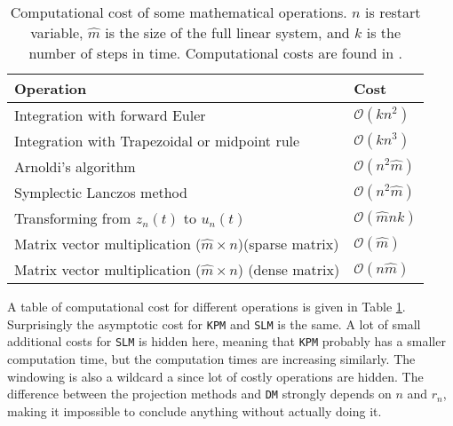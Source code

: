 \begin{table}
\caption{Computational cost of some mathematical operations. $n$ is restart variable, $\hat{m}$ is the size of the full linear system, and $k$ is the number of steps in time. Computational costs are found in \cite{complex}. }
\centering
\begin{tabular}{l l }
Operation & Cost \\
\hline
Integration with forward Euler & $\mathcal{O}(k n^2)$ \\
Integration with Trapezoidal or midpoint rule & $\mathcal{O}(k n^3)$ \\
Arnoldi's algorithm & $ \mathcal{ O }(n^2 \hat{m})$ \\
Symplectic Lanczos method & $ \mathcal{O}(n^2 \hat{m}) $\\
Transforming from $z_n(t)$ to $u_n(t)$ & $ \mathcal{O}(\hat{m}nk) $\\
Matrix vector multiplication ($\hat{m}\times n$)(sparse matrix) & $ \mathcal{O}(\hat{m}) $ \\
Matrix vector multiplication ($\hat{m}\times n$) (dense matrix) & $ \mathcal{O}(n \hat{m}) $
\end{tabular}


\label{tab:cd}
\end{table}

\noindent A table of computational cost for different operations is given in Table \ref{tab:cd}. \\
Surprisingly the asymptotic cost for \texttt{KPM} and \texttt{SLM} is the same. A lot of small additional costs for \texttt{SLM} is hidden here, meaning that \texttt{KPM} probably has a smaller computation time, but the computation times are increasing similarly. The windowing is also a wildcard a since lot of costly operations are hidden. The difference between the projection methods and \texttt{DM} strongly depends on $n$ and $r_n$, making it impossible to conclude anything without actually doing it.%

